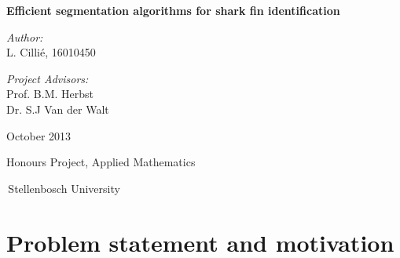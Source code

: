\documentclass[a4paper,10pt]{article}
\newenvironment{changemargin}[2]{%
\begin{list}{}{%
\setlength{\topsep}{0pt}%
\setlength{\leftmargin}{#1}%
\setlength{\rightmargin}{#2}%
\setlength{\listparindent}{\parindent}%
\setlength{\itemindent}{\parindent}%
\setlength{\parsep}{\parskip}%
}%
\item[]}{\end{list}}
\begin{document}
\begin{titlepage}

\begin{changemargin}{-1cm}{-1cm}
\begin{center}

\begin{minipage}{1.2\textwidth}
\begin{center}
\vspace{2cm}
    {\Huge \bf Efficient segmentation algorithms for shark fin
identification }
\end{center}
\end{minipage}

\vspace{1.3cm}

\begin{minipage}{0.49\textwidth}
\begin{center} \LARGE
\emph{Author:}\\
L. Cilli\'{e}, 16010450
\end{center}
\end{minipage}
\begin{minipage}{0.49\textwidth}
\begin{center} \LARGE
\emph{Project Advisors:} \\
Prof. B.M. Herbst\\Dr. S.J Van der Walt

\end{center}
\end{minipage}

\vspace{1.3cm}
{\LARGE October 2013}

\end{center}

\vfill

\vspace{20mm}
\hfill{\LARGE Honours Project, Applied Mathematics}\hfill\,

\,\hfill{\LARGE Stellenbosch University}\hfill\,

\end{changemargin}

\end{titlepage}

\begin{abstract}
 
\end{abstract}

\newpage
\tableofcontents

\newpage
\section{Problem statement and motivation}
\end{document}
